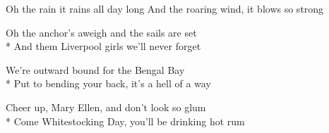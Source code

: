 

\versemark
Oh the rain it rains all day long
\vin{}
And the roaring wind, it blows so strong
\vin{}


\versemark
Oh the anchor’s aweigh and the sails are set\etc\\*
And them Liverpool girls we’ll never forget\etcrefrain

\versemark
We’re outward bound for the Bengal Bay\etc\\*
Put to bending your back, it’s a hell of a way\etcrefrain

\versemark
Cheer up, Mary Ellen, and don’t look so glum\etc\\*
Come Whitestocking Day, you’ll be drinking hot rum\etcrefrain

